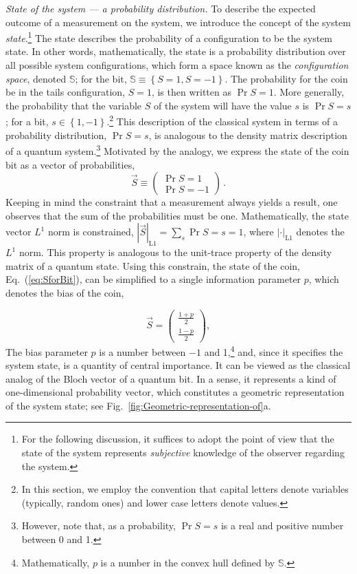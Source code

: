 \emph{State of the system — a probability distribution.} To describe
the expected outcome of a measurement on the system, we introduce
the concept of the system \emph{state}.\footnote{For the following discussion, it suffices to adopt the point of view
that the state of the system represents \emph{subjective }knowledge
of the observer regarding the system. } The state describes the probability of a configuration to be the
system state. In other words, mathematically, the state is a probability
distribution over all possible system configurations, which form a
space known as the\emph{ configuration space}, denoted $\mathbb{S}$;
for the bit, $\mathbb{S}\equiv\left\{ S=1,S=-1\right\} $. The probability
for the coin be in the tails configuration, $S=1$, is then written
as $\Pr{S=1}$. More generally, the probability that the variable
$S$ of the system will have the value $s$ is $\Pr{S=s}$; for a
bit, $s\in\left\{ 1,-1\right\} $.\footnote{In this section, we employ the convention that capital letters denote
variables (typically, random ones) and lower case letters denote values.} This description of the classical system in terms of a probability
distribution, $\Pr{S=s}$, is analogous to the density matrix description
of a quantum system.\footnote{However, note that, as a probability, $\Pr{S=s}$ is a real and positive
number between 0 and 1.} Motivated by the analogy, we express the state of the coin bit as
a vector of probabilities, 
\begin{equation}
\vec{S}\equiv\begin{pmatrix}\Pr{S=1}\\
\Pr{S=-1}
\end{pmatrix}\,.\label{eq:SforBit}
\end{equation}
Keeping in mind the constraint that a measurement always yields a
result, one observes that the sum of the probabilities must be one.
Mathematically, the state vector $L^{1}$ norm is constrained, $\left|\vec{S}\right|_{\mathrm{L1}}=\sum_{s}\Pr{S=s}=1$,
where $\left|\cdot\right|_{\mathrm{L1}}$ denotes the $L^{1}$ norm.
This property is analogous to the unit-trace property of the density
matrix of a quantum state. Using this constrain, the state of the
coin, Eq.~(\ref{eq:SforBit}), can be simplified to a single information
parameter $p$, which denotes the bias of the coin,

\begin{equation}
\vec{S}=\begin{pmatrix}\frac{1+p}{2}\\
\frac{1-p}{2}
\end{pmatrix},\label{eq:BitBloch}
\end{equation}
The bias parameter $p$ is a number between $-1$ and 1,\footnote{Mathematically, $p$ is a number in the convex hull defined by $\mathbb{S}$.}
and, since it specifies the system state, is a quantity of central
importance. It can be viewed as the classical analog of the Bloch
vector of a quantum bit. In a sense, it represents a kind of one-dimensional
probability vector, which constitutes a geometric representation of
the system state; see Fig.~\ref{fig:Geometric-representation-of}a.

